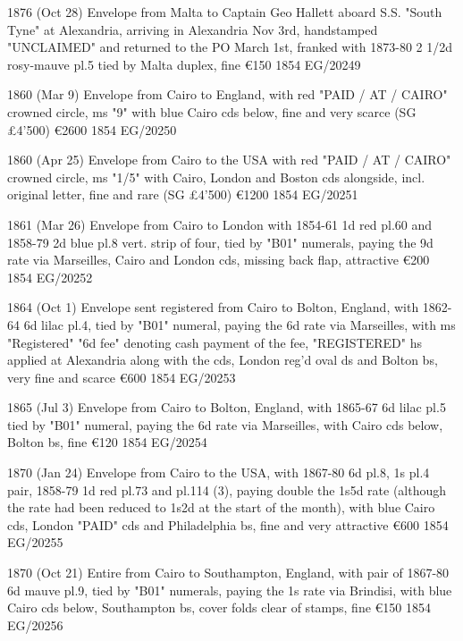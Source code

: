 \documentclass[justified]{tufte-book}
\begin{document}
%
{1876 (Oct 28) Envelope from Malta to Captain Geo Hallett aboard S.S. "South Tyne" at Alexandria, arriving in Alexandria Nov 3rd, handstamped "UNCLAIMED" and returned to the PO March 1st, franked with 1873-80 2 1/2d rosy-mauve pl.5 tied by Malta duplex, fine \euro150
}
{1854}%
{EG/20249}%
{}%
{}
{}%
{}

%
{1860 (Mar 9) Envelope from Cairo to England, with red "PAID / AT / CAIRO" crowned circle, ms "9" with blue Cairo cds below, fine and very scarce (SG £4'500) \euro2600
}
{1854}%
{EG/20250}%
{}%
{}
{}%
{}

%
{1860 (Apr 25) Envelope from Cairo to the USA with red "PAID / AT / CAIRO" crowned circle, ms "1/5" with Cairo, London and Boston cds alongside, incl. original letter, fine and rare (SG £4'500) \euro1200
}
{1854}%
{EG/20251}%
{}%
{}
{}%
{}

%
{1861 (Mar 26) Envelope from Cairo to London with 1854-61 1d red pl.60 and 1858-79 2d blue pl.8 vert. strip of four, tied by "B01" numerals, paying the 9d rate via Marseilles, Cairo and London cds, missing back flap, attractive \euro200
}
{1854}%
{EG/20252}%
{}%
{}
{}%
{}

%
{1864 (Oct 1) Envelope sent registered from Cairo to Bolton, England, with 1862-64 6d lilac pl.4, tied by "B01" numeral, paying the 6d rate via Marseilles, with ms "Registered" "6d fee" denoting cash payment of the fee, "REGISTERED" hs applied at Alexandria along with the cds, London reg'd oval ds and Bolton bs, very fine and scarce \euro600
}
{1854}%
{EG/20253}%
{}%
{}
{}%
{}

%
{1865 (Jul 3) Envelope from Cairo to Bolton, England, with 1865-67 6d lilac pl.5 tied by "B01" numeral, paying the 6d rate via Marseilles, with Cairo cds below, Bolton bs, fine \euro120
}
{1854}%
{EG/20254}%
{}%
{}
{}%
{}

%
{1870 (Jan 24) Envelope from Cairo to the USA, with 1867-80 6d pl.8, 1s pl.4 pair, 1858-79 1d red pl.73 and pl.114 (3), paying double the 1s5d rate (although the rate had been reduced to 1s2d at the start of the month), with blue Cairo cds, London "PAID" cds and Philadelphia bs, fine and very attractive \euro600
}
{1854}%
{EG/20255}%
{}%
{}
{}%
{}

%
{1870 (Oct 21) Entire from Cairo to Southampton, England, with pair of 1867-80 6d mauve pl.9, tied by "B01" numerals, paying the 1s rate via Brindisi, with blue Cairo cds below, Southampton bs, cover folds clear of stamps, fine \euro150
}
{1854}%
{EG/20256}%
{}%
{}
{}%
{}
\end{document}
